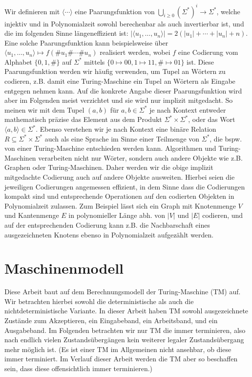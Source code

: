 Wir definieren mit $\langle\cdots\rangle$ eine Paarungsfunktion von $\bigcup_{i\geq 0} (\Sigma^*)^i \to \Sigma^*$, welche injektiv und in Polynomialzeit sowohl berechenbar als auch invertierbar ist, und die im folgenden Sinne längeneffizient ist: $|\langle u_1, \dots, u_n\rangle| = 2(|u_1|+\cdots+|u_n|+n)$. Eine solche Paarungsfunktion kann beispielsweise über $\langle u_1, \dots, u_n\rangle\mapsto f(\#u_1\#\cdots\#u_n)$ realisiert werden, wobei $f$ eine Codierung vom Alphabet $\{0,1,\#\}$ auf $\Sigma^*$ mittels $\{0\mapsto 00, 1\mapsto 11, \#\mapsto 01\}$ ist.
Diese Paarungsfunktion werden wir häufig verwenden, um Tupel an Wörtern zu codieren, z.B. damit eine Turing-Maschine ein Tupel an Wörtern als Eingabe entgegen nehmen kann. Auf die konkrete Angabe dieser Paarungsfunktion wird aber im Folgenden meist verzichtet und sie wird nur implizit mitgedacht. So meinen wir mit dem Tupel $(a,b)$ für $a,b\in\Sigma^*$ je nach Kontext entweder mathematisch präzise das Element aus dem Produkt $\Sigma^*\times\Sigma^*$, oder das Wort $\langle a,b\rangle\in\Sigma^*$. Ebenso verstehen wir je nach Kontext eine binäre Relation $R\subseteq\Sigma^*\times\Sigma^*$ auch als eine Sprache im Sinne einer Teilmenge von $\Sigma^*$, die bspw. von einer Turing-Maschine entschieden werden kann.
Algorithmen und Turing-Maschinen verarbeiten nicht nur Wörter, sondern auch andere Objekte wie z.B. Graphen oder Turing-Maschinen.
Daher werden wir die obige implizit mitgedachte Codierung auch auf andere Objekte ausweiten. Hierbei seien die jeweiligen Codierungen angemessen effizient, in dem Sinne dass die Codierungen kompakt sind und entsprechende Operationen auf den codierten Objekten in Polynomialzeit zulassen. Zum Beispiel lässt sich ein Graph mit Knotenmenge $V$ und Kantenmenge $E$ in polynomieller Länge abh. von $|V|$ und $|E|$ codieren, und auf der entsprechenden Codierung kann z.B. die Nachbarschaft eines ausgezeichneten Knotens ebenso in Polynomialzeit aufgezählt werden.

\section{Maschinenmodell}\label{sec:prelim-machines}

Diese Arbeit baut auf dem Berechnungsmodell der Turing-Maschine (TM) auf. Wir betrachten hierbei sowohl die deterministische als auch die nichtdeterministische Variante. In dieser Arbeit haben TM sowohl ausgezeichnete Zustände zum Akzeptieren, ein Eingabeband, ein Arbeitsband, und ein Ausgabeband. Im Folgenden betrachten wir nur TM die immer terminieren, also nach endlich vielen Zustandsübergängen kein weiterer legaler Zustandsübergang mehr möglich ist. (Es ist einer TM im Allgemeinen nicht ansehbar, ob diese immer terminiert. Im Verlauf dieser Arbeit werden die TM aber so beschaffen sein, dass diese offensichtlich immer terminieren.) 

